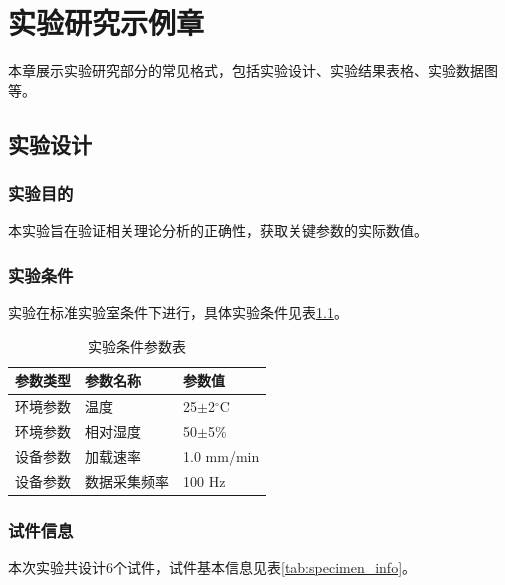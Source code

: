 \chapter{实验研究示例章}
\label{chap:experiment}

本章展示实验研究部分的常见格式，包括实验设计、实验结果表格、实验数据图等。

\section{实验设计}
\subsection{实验目的}
本实验旨在验证相关理论分析的正确性，获取关键参数的实际数值。

\subsection{实验条件}
实验在标准实验室条件下进行，具体实验条件见表\ref{tab:experiment_conditions}。

\begin{table}[htbp]
    \caption{实验条件参数表}
    \label{tab:experiment_conditions}
    \centering
    \begin{tabular}{lll}
        \toprule
        参数类型 & 参数名称 & 参数值 \\
        \midrule
        环境参数 & 温度 & 25$\pm$2$^\circ$C \\
        环境参数 & 相对湿度 & 50$\pm$5\% \\
        设备参数 & 加载速率 & 1.0 mm/min \\
        设备参数 & 数据采集频率 & 100 Hz \\
        \bottomrule
    \end{tabular}
\end{table}

\subsection{试件信息}
本次实验共设计6个试件，试件基本信息见表\ref{tab:specimen_info}。

